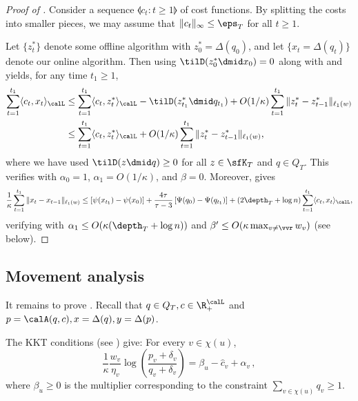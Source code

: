 \begin{proof}[Proof of ]
	Consider a sequence $\llangle c_t : t \geq 1\rrangle$ of cost functions.
	By splitting the costs into smaller pieces, we may assume that $\|c_t\|_{\infty} \leq \eps_T$ for all $t \geq 1$.
	
	Let $\{z_t^*\}$ denote some offline algorithm with $z_0^* = \Delta(q_0)$, and let $\{x_t = \Delta(q_t)\}$ denote our
	online algorithm.  Then using $\tilD(z_{0}^* \dmid x_0) = 0$ along with  and 
	yields, for any time $t_1 \geq 1$,
	\begin{align*}
	\sum_{t=1}^{t_1} \langle c_t, x_t\rangle_{\calL} &\leq 
	\sum_{t=1}^{t_1} \langle c_t,z_t^*\rangle_{\calL} -
	\tilD(z_{t_1}^* \dmid q_{t_1}) + O(1/\kappa) \sum_{t=1}^{t_1} \|z_t^*-z_{t-1}^*\|_{\ell_1(w)} \\
	&\leq \sum_{t=1}^{t_1} \langle c_t,z_t^*\rangle_{\calL}
	+ O(1/\kappa) \sum_{t=1}^{t_1} \|z_t^*-z_{t-1}^*\|_{\ell_1(w)},
	\end{align*}
	where we have used $\tilD(z \dmid q) \geq 0$ for all $z \in \sfK_T$ and $q \in Q_T$.
	This verifies  with $\alpha_0=1$, $\alpha_1 = O(1/\kappa)$, and $\beta = 0$.
	Moreover,  gives
	\[
	\frac{1}{\kappa} \sum_{t=1}^{t_1} \|x_t-x_{t-1}\|_{\ell_1(w)} \leq 
	\left[\psi(x_{t_1})-\psi(x_0)\right]+\frac{4\tau}{\tau-3} \left[\Psi(q_0)-\Psi(q_{t_1})\right] + \left(2\depth_T + \log n\right) 
	\sum_{t=1}^{t_1} \langle c_t,x_t\rangle_{\calL},
	\]
	verifying  with $\alpha_1 \leq O(\kappa(\depth_T + \log n))$ and $\beta' \leq O(\kappa \max_{v \neq \vvr} w_v)$ (see  below).
\end{proof}

\subsection{Movement analysis}
\label{sec:movement-analysis}

It remains to prove .
Recall that $q \in Q_T, c \in \R_+^{\calL}$ and $p = \calA(q,c), x=\Delta(q),y=\Delta(p)$.

The KKT conditions %
(see ) %
give:  For every $v \in \chi(u)$,
\begin{equation}\label{eq:kkt2}
\frac{1}{\kappa} \frac{w_v}{\eta_v} \log \left(\frac{p_v+\delta_v}{q_v+\delta_v}\right) = \beta_u - \hat{c}_v + \alpha_v\,,
\end{equation}
where $\beta_u \geq 0$ is the multiplier corresponding to the constraint $\sum_{v \in \chi(u)} q_v \geq 1$.

